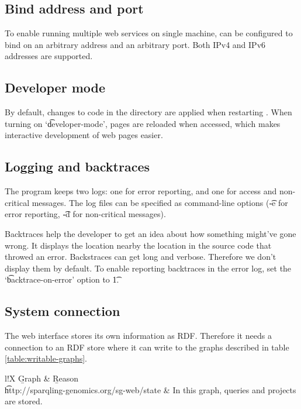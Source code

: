 \subsection{Bind address and port}

  To enable running multiple web services on single machine, 
  can be configured to bind on an arbitrary address and an arbitrary port.
  Both IPv4 and IPv6 addresses are supported.

\subsection{Developer mode}

  By default, changes to code in the  directory are
  applied when restarting .  When turning on
  `\t{developer-mode}', pages are reloaded when accessed, which makes
  interactive development of web pages easier.

\subsection{Logging and backtraces}
\label{sec:logging}

  The  program keeps two logs: one for error reporting, and
  one for access and non-critical messages.  The log files can be specified
  as command-line options (\t{-e} for error reporting, \t{-d} for
  non-critical messages).

  Backtraces help the developer to get an idea about how something might've
  gone wrong.  It displays the location nearby the location in the source code
  that throwed an error.  Backstraces can get long and verbose.  Therefore we
  don't display them by default.  To enable reporting backtraces in the error
  log, set the `\t{backtrace-on-error}' option to \t{1}.

\subsection{System connection}

  The web interface stores its own information as RDF.  Therefore it needs
  a connection to an RDF store where it can write to the graphs described
  in table \ref{table:writable-graphs}.

  \hypersetup{urlcolor=black}
  \begin{table}[H]
    \begin{tabularx}{\textwidth}{l!{\VRule[-1pt]}X}
      \headrow
      \b{Graph} & \b{Reason}\\
      \evenrow
      \t{http://sparqling-genomics.org/sg-web/state}
      & In this graph, queries and projects are stored.\\
    \end{tabularx}
    \caption{\small Graphs that need to be writable for the web interface.}
    \label{table:writable-graphs}
  \end{table}
  \hypersetup{urlcolor=LinkGray}

